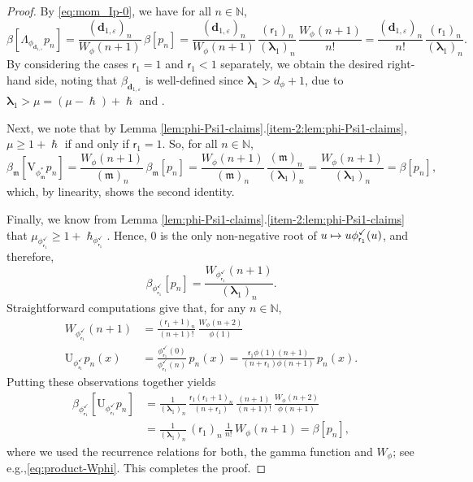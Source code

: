 \documentclass[11pt]{article}
\newcommand{\eg}{e.g.,\xspace}
\numberwithin{equation}{section}
\let\epsilon\varepsilon
\newcommand\mto{\mathchoice{\longmapsto}{\mapsto}{\mapsto}{\mapsto}}
\theoremstyle{plain}
\theoremstyle{definition}
\newcommand{\N}{\mathbb{N}}
\newcommand{\m}{\mathfrak{m}}
\newcommand{\dz}{{\bm{d}}_{1,\epsilon}}
\newcommand{\lam}{{\bm{\lambda}_1}}
\newcommand{\vat}{{\mathsf{r}_1}}
\newcommand{\phm}{{\phi_\m^*}}
\renewcommand{\varphi}{{\phi_{\vat}^{\checkmark}}}
\newcommand{\gab}[1][\lam,\mo]{{\beta_{#1}}}
\let\h\hslash
\let\mo\mu
\let\bpsi\beta
\begin{document}
\begin{proof}
By \eqref{eq:mom_Ip-0}, we have for all $n \in \N$,
\begin{equation*}
\bpsi[\Lambda_{\phi_{\dz}} p_n] = \frac{(\dz)_n}{W_{\phi}(n+1)}\, \bpsi[p_n]=
\frac{(\dz)_n}{W_{\phi}(n+1)}\, \frac{(\vat)_n}{(\lam)_n}\,\frac{W_{\phi}(n+1)}{n!} =\frac{(\dz)_n}{n!}\, \frac{(\vat)_n}{(\lam)_n}.
\end{equation*}
By considering the cases $\vat=1$ and $\vat<1$ separately, we obtain the desired right-hand side, noting that $\gab[\dz]$ is well-defined since $\lam > d_\phi +1$, due to $ \lam > \mo = (\mo-\h) + \h$ and \cite[Prop.\,4.4(1)]{Patie-Savov-GeL}.

Next, we note that by Lemma \ref{lem:phi-Psi1-claims}.\eqref{item-2:lem:phi-Psi1-claims},
$\mo \geq 1+\h$ if and only if $\vat = 1$. So, for all $n \in \N$,
\begin{equation*}
\gab[\m] [\mathrm{V}_{\phm} p_n] = \frac{W_{\phi}(n+1)}{(\m)_n}\, \gab[\m] [p_n] = \frac{W_{\phi}(n+1)}{(\m)_n}\, \frac{(\m)_n}{(\lam)_n} = \frac{W_{\phi}(n+1)}{(\lam)_n} = \bpsi[p_n],
\end{equation*}
which, by linearity, shows the second identity.

Finally, we know from Lemma \ref{lem:phi-Psi1-claims}.\eqref{item-2:lem:phi-Psi1-claims} that
$\mo_\varphi \geq 1+\h_\varphi$. Hence, $0$ is the only non-negative root of $u \mto u\varphi(u)$, and therefore,
\begin{equation*}
\bpsi_\varphi [p_n] = \frac{W_\varphi(n+1)}{(\lam)_n}.
\end{equation*}
Straightforward computations give that, for any $n \in \N$,
\begin{align*}
W_\varphi(n+1) &= \frac{(\vat+1)_{n}}{(n+1)!}\, \frac{W_\phi(n+2)}{\phi(1)} \\
\tag*{and} \mathrm{U}_\varphi p_n(x) &= \frac{\varphi(0)}{\varphi(n)}\, p_n(x) = \frac{\vat\phi(1)(n+1)}{(n+\vat)\phi(n+1)}\, p_n(x).
\end{align*}
Putting these observations together yields
\begin{align*}
\bpsi_\varphi[\mathrm{U}_\varphi p_n]&= \frac{1}{(\lam)_n}\, \frac{\vat (\vat+1)_{n}}{(n+\vat)}\, \frac{(n+1)}{(n+1)!}\, \frac{W_{\phi}(n+2)}{\phi(n+1)}\\
&=\frac{1}{(\lam)_n}\, (\vat)_n\, \frac{1}{n!}\, W_\phi(n+1) = \bpsi[p_n],
\end{align*}
where we used the recurrence relations for both, the gamma function and $W_\phi$; see \eg \eqref{eq:product-Wphi}.
This completes the proof.
\end{proof}
\end{document}
